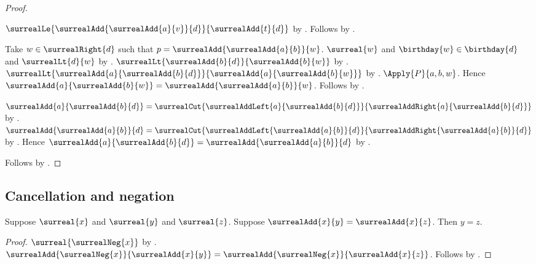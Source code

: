 \begin{proof}
\begin{subproof}
\begin{subproof}
\begin{byCase}
\begin{subproof}
                        $\surrealLe{\surrealAdd{\surrealAdd{a}{v}}{d}}
                            {\surrealAdd{t}{d}}$
                            by .
                        Follows by .
                    \end{subproof}
                    Take $w\in\surrealRight{d}$ such that
                        $p=\surrealAdd{\surrealAdd{a}{b}}{w}$.
                    $\surreal{w}$ and $\birthday{w}\in\birthday{d}$ and
                        $\surrealLt{d}{w}$
                        by .
                    $\surrealLt{\surrealAdd{b}{d}}
                        {\surrealAdd{b}{w}}$
                        by .
                    $\surrealLt{\surrealAdd{a}{\surrealAdd{b}{d}}}
                        {\surrealAdd{a}{\surrealAdd{b}{w}}}$
                        by .
                    $\Apply{P}{a,b,w}$.
                    Hence $\surrealAdd{a}{\surrealAdd{b}{w}}=
                        \surrealAdd{\surrealAdd{a}{b}}{w}$.
                    Follows by \auto.
            \end{byCase}
        \end{subproof}
        $\surrealAdd{a}{\surrealAdd{b}{d}}=
            \surrealCut{\surrealAddLeft{a}{\surrealAdd{b}{d}}}
                {\surrealAddRight{a}{\surrealAdd{b}{d}}}$
            by .
        $\surrealAdd{\surrealAdd{a}{b}}{d}=
            \surrealCut{\surrealAddLeft{\surrealAdd{a}{b}}{d}}
                {\surrealAddRight{\surrealAdd{a}{b}}{d}}$
            by .
        Hence $\surrealAdd{a}{\surrealAdd{b}{d}}=
            \surrealAdd{\surrealAdd{a}{b}}{d}$
            by .
    \end{subproof}
    Follows by .
\end{proof}

\subsection{Cancellation and negation}

\begin{corollary}\label{surreal_add_cancel_left}
    Suppose $\surreal{x}$ and $\surreal{y}$ and $\surreal{z}$.
    Suppose $\surrealAdd{x}{y}=\surrealAdd{x}{z}$.
    Then $y=z$.
\end{corollary}
\begin{proof}
    $\surreal{\surrealNeg{x}}$
        by .
    $\surrealAdd{\surrealNeg{x}}{\surrealAdd{x}{y}}
        =\surrealAdd{\surrealNeg{x}}{\surrealAdd{x}{z}}$.
    Follows by
        .
\end{proof}

